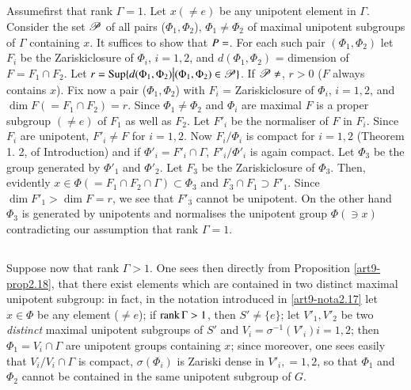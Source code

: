 \subsection{}\label{art9-subsec3.2}
Assume\pageoriginale first that rank $\Gamma = 1$. Let $x (\neq e)$ be any unipotent element in $\Gamma$. Consider the set $\mathscr{P}$ of all pairs ($\Phi_1, \Phi_2$), $\Phi_1 \neq \Phi_2$ of maximal unipotent subgroups of $\Gamma$ containing $x$. It suffices to show that $P=\empty$. For each such pair $(\Phi_1, \Phi_2)$ let $F_i$ be the Zariskiclosure of $\Phi_i$, $i = 1, 2$, and $d (\Phi_1, \Phi_2)$ = dimension of $F = F_1 \cap F_2$. Let $r = \operatorname{Sup} \{d (\Phi_1,\Phi_2) \big| (\Phi_1, \Phi_2) \in \mathscr{P}\}$. If $\sP \neq \empty$, $r > 0$ ($F$ always contains $x$). Fix now a pair ($\Phi_1, \Phi_2$) with $F_i$ = Zariskiclosure of $\Phi_i$, $i = 1, 2$, and $\dim F (= F_1 \cap F_2) = r$. Since $\Phi_1 \neq \Phi_2$ and $\Phi_i$ are maximal $F$ is a proper subgroup $(\neq e)$ of $F_1$ as well as $F_2$. Let $F'_i$ be the normaliser of $F$ in $F_i$. Since $F_i$ are unipotent, $F'_i \neq F$ for $i = 1, 2$. Now $F_i / \Phi_i$ is compact for $i= 1, 2$ (\cf Theorem 1. 2, of Introduction) and if $\Phi'_i = F'_i \cap \Gamma$, $F'_i / \Phi'_i$ is again compact. Let $\Phi_3$ be the group generated by $\Phi'_1$ and $\Phi'_2$. Let $F_3$ be the Zariskiclosure of $\Phi_3$. Then, evidently $x \in \Phi (= F_1 \cap F_2 \cap \Gamma) \subset \Phi_3$ and $F_3 \cap F_1 \supset F'_1$. Since $\dim F'_1 > \dim F = r$, we see that $F'_3$ cannot be unipotent. On the other hand $\Phi_3$ is generated by unipotents  and normalises the unipotent group $\Phi (\ni x)$ contradicting our assumption that rank $\Gamma=1$.

\subsection{}\label{art9-subsec3.3}
Suppose now that rank $\Gamma >1$. One sees then directly from Proposition \ref{art9-prop2.18}, that there exist elements which are contained in two distinct maximal unipotent subgroup: in fact, in the notation introduced in \ref{art9-nota2.17} let $x \in \Phi$ be any element ($\neq e$); if $\operatorname{rank} \Gamma > 1$, then $S' \neq \{e\}$; let $V'_1, V'_2$ be two \textit{distinct} maximal unipotent subgroups of $S'$ and $V_i = \sigma^{-1} (V'_i) i = 1, 2$; then $\Phi_1 = V_i \cap \Gamma$ are unipotent groups containing $x$; since moreover, one sees easily that $V_i / V_i \cap \Gamma$ is compact, $\sigma (\Phi_i)$ is Zariski dense in $V'_i, = 1, 2$, so that $\Phi_1$ and $\Phi_2$ cannot be contained in the same unipotent subgroup of $G$.


